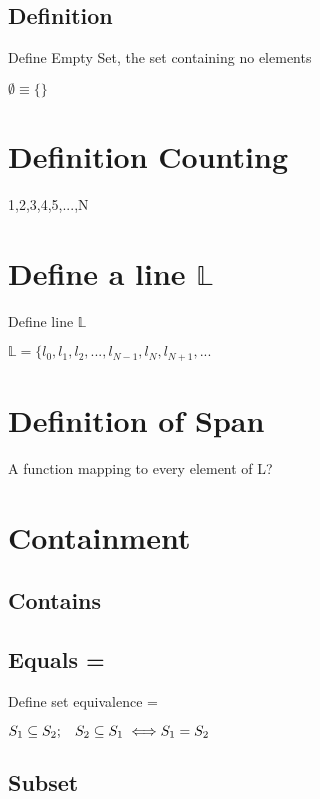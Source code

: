 \documentclass[11pt]{article}
\begin{document}
\subsection{Definition}
Define Empty Set, the set containing no elements
\begin{center}
$
\emptyset \equiv \{\}
$
\end{center}





\section{Definition Counting}
1,2,3,4,5,...,N



\section{Define a line $\mathbb{L}$}
Define line $\mathbb{L}$
\begin{center}
$
\mathbb{L} = \{l_0,l_{1},l_{2},...,l_{N-1},l_N,l_{N+1},...
$
\end{center}


\section{Definition of Span}
A function mapping to every element of L?





\section{Containment}
\subsection{Contains}
\subsection{Equals = }
Define set equivalence  =
\begin{center}
$
S_1 \subseteq S_2 ; \hspace{3mm} S_2 \subseteq S_1 \hspace{1mm} \Longleftrightarrow S_1 = S_2 \hspace{3mm}
$
\end{center}


\subsection{Subset}
\end{document}
